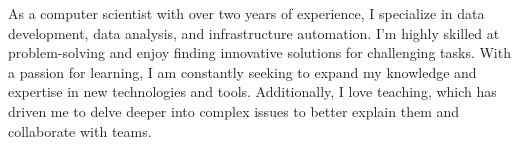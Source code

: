 

\begin{cvparagraph}


As a computer scientist with over two years of experience, I specialize in data development, data analysis, and infrastructure automation. I'm highly skilled at problem-solving and enjoy finding innovative solutions for challenging tasks. With a passion for learning, I am constantly seeking to expand my knowledge and expertise in new technologies and tools. Additionally, I love teaching, which has driven me to delve deeper into complex issues to better explain them and collaborate with teams.


\end{cvparagraph}
